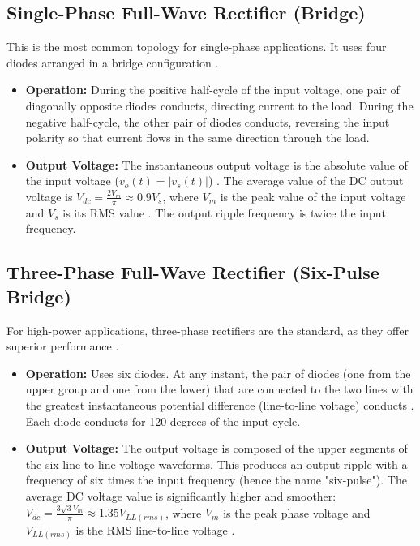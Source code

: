 \documentclass[12pt,a4paper]{article}
\begin{document}
\subsection{Single-Phase Full-Wave Rectifier (Bridge)}

This is the most common topology for single-phase applications. It uses four diodes arranged in a bridge configuration \cite{rashid2014, mohan2003}.

\begin{itemize}
    \item \textbf{Operation:} During the positive half-cycle of the input voltage, one pair of diagonally opposite diodes conducts, directing current to the load. During the negative half-cycle, the other pair of diodes conducts, reversing the input polarity so that current flows in the same direction through the load.
    
    \item \textbf{Output Voltage:} The instantaneous output voltage is the absolute value of the input voltage ($v_o(t) = |v_s(t)|$) \cite{rashid2014}. The average value of the DC output voltage is $V_{dc} = \frac{2V_m}{\pi} \approx 0.9V_s$, where $V_m$ is the peak value of the input voltage and $V_s$ is its RMS value \cite{rashid2014, mohan2003}. The output ripple frequency is twice the input frequency.
\end{itemize}

\subsection{Three-Phase Full-Wave Rectifier (Six-Pulse Bridge)}

For high-power applications, three-phase rectifiers are the standard, as they offer superior performance \cite{rashid2014, mohan2003}.

\begin{itemize}
    \item \textbf{Operation:} Uses six diodes. At any instant, the pair of diodes (one from the upper group and one from the lower) that are connected to the two lines with the greatest instantaneous potential difference (line-to-line voltage) conducts \cite{rashid2014}. Each diode conducts for 120 degrees of the input cycle.
    
    \item \textbf{Output Voltage:} The output voltage is composed of the upper segments of the six line-to-line voltage waveforms. This produces an output ripple with a frequency of six times the input frequency (hence the name "six-pulse"). The average DC voltage value is significantly higher and smoother: $V_{dc} = \frac{3\sqrt{3}V_m}{\pi} \approx 1.35V_{LL(rms)}$, where $V_m$ is the peak phase voltage and $V_{LL(rms)}$ is the RMS line-to-line voltage \cite{rashid2014, mohan2003}.
\end{itemize}
\end{document}
